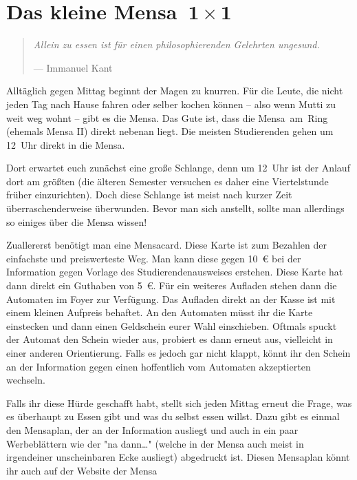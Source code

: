 \section[Das kleine Mensa~1~×~1]{Das kleine Mensa~$\mathbf{1 \times 1}$}
\begin{multicols*}{2}
\begin{quote}
\textit{Allein zu essen ist für einen philosophierenden Gelehrten ungesund.}

\hfill--- Immanuel Kant
\end{quote}
\begin{center}
\end{center}
\vspace{-1em}
Alltäglich gegen Mittag beginnt der Magen zu knurren. Für die Leute, die nicht jeden Tag nach Hause fahren oder selber kochen können -- also wenn Mutti zu weit weg wohnt -- gibt es die Mensa. Das Gute ist, dass die Mensa~am~Ring (ehemals Mensa II) direkt nebenan liegt. Die meisten Studierenden gehen um 12~Uhr direkt in die Mensa.

Dort erwartet euch zunächst eine große Schlange, denn um 12~Uhr ist der Anlauf dort am größten (die älteren Semester versuchen es daher eine Viertelstunde früher einzurichten). Doch diese Schlange ist meist nach kurzer Zeit überraschenderweise überwunden. Bevor man sich anstellt, sollte man allerdings so einiges über die Mensa wissen!

Zuallererst benötigt man eine Mensacard. Diese Karte ist zum Bezahlen der einfachste und preiswerteste Weg. Man kann diese gegen \SI{10}{\euro} bei der Information gegen Vorlage des Studierendenausweises erstehen. Diese Karte hat dann direkt ein Guthaben von \SI{5}{\euro}. Für ein weiteres Aufladen stehen dann die Automaten im Foyer zur Verfügung. Das Aufladen direkt an der Kasse ist mit einem kleinen Aufpreis behaftet. An den Automaten müsst ihr die Karte einstecken und dann einen Geldschein eurer Wahl einschieben. Oftmals spuckt der Automat den Schein wieder aus, probiert es dann erneut aus, vielleicht in einer anderen Orientierung. Falls es jedoch gar nicht klappt, könnt ihr den Schein an der Information gegen einen hoffentlich vom Automaten akzeptierten wechseln.

Falls ihr diese Hürde geschafft habt, stellt sich jeden Mittag erneut die Frage, was es überhaupt zu Essen gibt und was du selbst essen willst. Dazu gibt es einmal den Mensaplan, der an der Information ausliegt und auch in ein paar Werbeblättern wie der "na dann\dots" (welche in der Mensa auch meist in irgendeiner unscheinbaren Ecke ausliegt) abgedruckt ist. Diesen Mensaplan könnt ihr auch auf der Website der Mensa


\end{multicols*}
